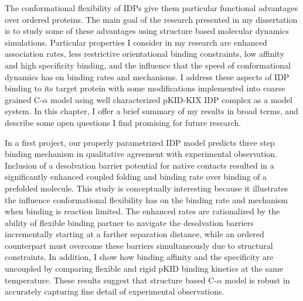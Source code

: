 \documentclass[../talant.diss.submit.tex]{subfiles}
\begin{document}
\label{chap:outlook}
The conformational flexibility of IDPs give them particular
functional advantages over ordered proteins.
\cite{dyson:16m,berlow:15f,zhou:12,dunker:01int,dyson:05,
  shoeportman:00,uversky:05,gunasekaran:03,kriwacki:96,liu:14a}
The main goal of the research
presented in my dissertation is to study some of these advantages using
structure based molecular dynamics simulations.  Particular properties I
consider in my research are enhanced association rates, less restrictive
orientational binding constraints, low affinity and high specificity binding,
and the influence that the speed of conformational dynamics has on binding rates
and mechanisms.  I address these aspects of IDP binding to its target protein
with some modifications implemented into coarse grained C-$\alpha$ model using
well characterized pKID-KIX IDP complex as a model system. In this
chapter, I offer a brief summary of my results in broad terms,
and describe some open questions I
find promising for future research.

In a first project, our properly parametrized IDP model predicts three step
binding mechanism in qualitative agreement with experimental
observation.\cite{sugase:07} Inclusion of a desolvation barrier potential for
native contacts resulted in a significantly enhanced coupled folding and binding
rate over binding of a prefolded molecule.  This study is conceptually
interesting because it illustrates the influence conformational flexibility
has on the binding rate and mechanism  when binding is reaction limited.
The enhanced rates are rationalized by the ability of flexible binding partner
to navigate the desolvation barriers incrementally starting at a farther
separation distance, while an ordered counterpart must overcome these barriers
simultaneously due to structural constraints. In addition, I show how binding
affinity and the specificity are uncoupled by comparing flexible and rigid pKID
binding kinetics at the same temperature.  These results suggest that structure
based C-$\alpha$ model is robust in accurately capturing fine detail of
experimental observations.
\end{document}
